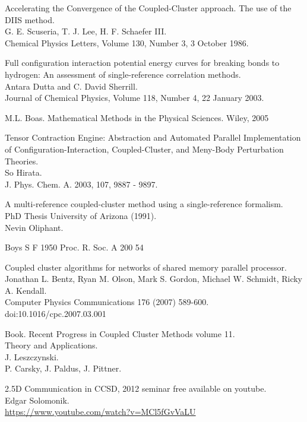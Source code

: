 \documentclass[a4paper,norsk,11pt,twoside]{report}
\begin{document}
\begin{thebibliography}{}
Accelerating the Convergence of the Coupled-Cluster approach. The use of the DIIS method. \\
G. E. Scuseria, T. J. Lee, H. F. Schaefer III. \\
Chemical Physics Letters, Volume 130, Number 3, 3 October 1986. 

Full configuration interaction potential energy curves for breaking bonds to hydrogen: An assessment of single-reference correlation methods. \\
Antara Dutta and C. David Sherrill. \\
Journal of Chemical Physics, Volume 118, Number 4, 22 January 2003.

M.L. Boas. Mathematical Methods in the Physical Sciences. Wiley, 2005

Tensor Contraction Engine: Abstraction and Automated Parallel Implementation of Configuration-Interaction, Coupled-Cluster, and Meny-Body Perturbation Theories. \\
So Hirata. \\
J. Phys. Chem. A. 2003, 107, 9887 - 9897.

A multi-reference coupled-cluster method using a single-reference formalism. \\
PhD Thesis University of Arizona (1991). \\
Nevin Oliphant. 

Boys S F 1950 Proc. R. Soc. A 200 54

Coupled cluster algorithms for networks of shared memory parallel processor.\\
Jonathan L. Bentz, Ryan M. Olson, Mark S. Gordon, Michael W. Schmidt, Ricky A. Kendall.\\
Computer Physics Communications 176 (2007) 589-600.\\
doi:10.1016/cpc.2007.03.001

Book. Recent Progress in Coupled Cluster Methods volume 11.\\
Theory and Applications.\\
J. Leszczynski.\\
P. Carsky, J. Paldus, J. Pittner.

2.5D Communication in CCSD, 2012 seminar free available on youtube. \\
Edgar Solomonik. \\
\url{https://www.youtube.com/watch?v=MCl5fGvVaLU}


\end{thebibliography}
\end{document}

